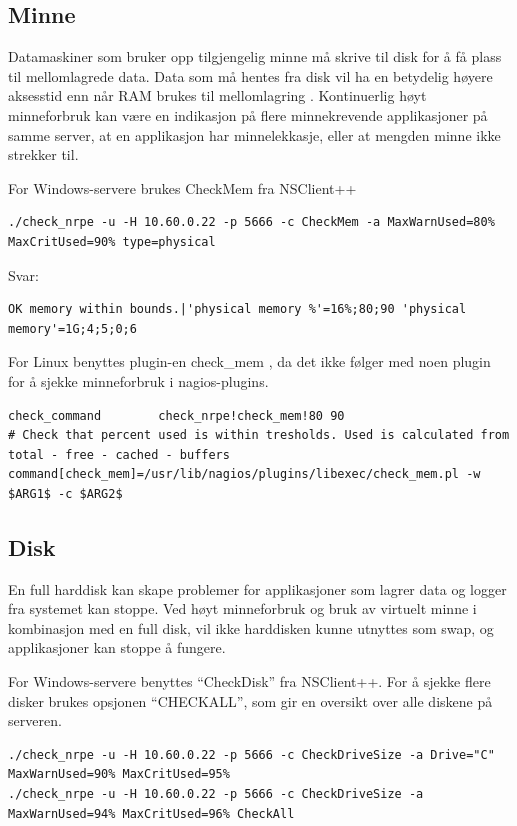 \subsection{Minne}
Datamaskiner som bruker opp tilgjengelig minne må skrive til disk for å få plass til mellomlagrede data. Data som må hentes fra disk vil ha en betydelig høyere aksesstid enn når RAM brukes til mellomlagring \cite{wiki:mem}. 
Kontinuerlig høyt minneforbruk kan være en indikasjon på flere minnekrevende applikasjoner på samme server, at en applikasjon har minnelekkasje, eller at mengden minne ikke strekker til.

For Windows-servere brukes CheckMem fra NSClient++
\begin{lstlisting}[style=example]
./check_nrpe -u -H 10.60.0.22 -p 5666 -c CheckMem -a MaxWarnUsed=80% MaxCritUsed=90% type=physical
\end{lstlisting}
Svar:
\begin{lstlisting}[style=example]
OK memory within bounds.|'physical memory %'=16%;80;90 'physical memory'=1G;4;5;0;6
\end{lstlisting}

For Linux benyttes plugin-en check\_mem \cite{checklinuxmem}, da det ikke følger med noen plugin for å sjekke minneforbruk i nagios-plugins.
\begin{lstlisting}[style=example]
   check_command        check_nrpe!check_mem!80 90
# Check that percent used is within tresholds. Used is calculated from total - free - cached - buffers 
command[check_mem]=/usr/lib/nagios/plugins/libexec/check_mem.pl -w $ARG1$ -c $ARG2$
\end{lstlisting}
\subsection{Disk}
En full harddisk kan skape problemer for applikasjoner som lagrer data og logger fra systemet kan stoppe. Ved høyt minneforbruk og bruk av virtuelt minne i kombinasjon med en full disk, vil ikke harddisken kunne utnyttes som swap, og applikasjoner kan stoppe å fungere.

For Windows-servere benyttes ``CheckDisk'' fra NSClient++. For å sjekke flere disker brukes opsjonen ``CHECKALL'', som gir en oversikt over alle diskene på serveren.

\begin{lstlisting}[style=example]
./check_nrpe -u -H 10.60.0.22 -p 5666 -c CheckDriveSize -a Drive="C" MaxWarnUsed=90% MaxCritUsed=95%
./check_nrpe -u -H 10.60.0.22 -p 5666 -c CheckDriveSize -a MaxWarnUsed=94% MaxCritUsed=96% CheckAll
\end{lstlisting}

